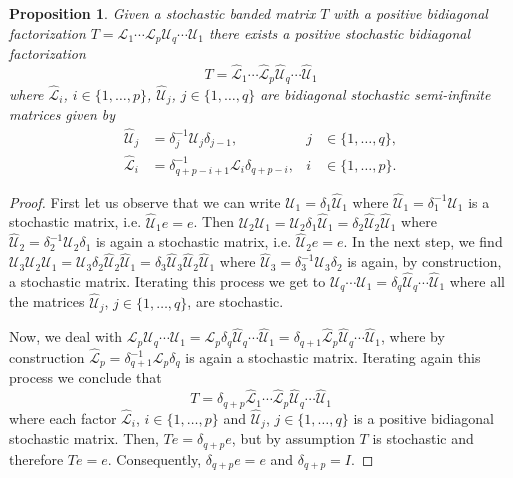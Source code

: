 \documentclass[11pt]{amsart}
\theoremstyle{plain}
\newtheorem{pro}[teo]{Proposition}
\newcommand{\1}{\text{\fontseries{bx}\selectfont \textup 1}}
\begin{document}
\begin{pro}
	Given a stochastic banded matrix $T$ with a positive bidiagonal factorization $T=\mathscr L_1\cdots \mathscr L_p\mathscr U_q\cdots \mathscr U_1$ there exists a positive stochastic bidiagonal factorization
	\[
	T=	\hat{\mathscr L}_1\cdots\hat{\mathscr L}_p\hat{\mathscr U}_q\cdots \hat{\mathscr U}_1
	\]
	where $\hat{\mathscr L}_i$, $i\in\{1,\dots,p\}$, $\hat{\mathscr U}_j$, $j\in\{1,\dots,q\}$ are bidiagonal stochastic semi-infinite matrices given by
	\[
	\begin{aligned}
		\hat{\mathscr U}_j &= \delta_j^{-1} \mathscr U_j \delta_{j-1}, & j&\in\{1,\dots,q\},\\
		\hat{\mathscr L}_i&= \delta_{q+p-i+1}^{-1} \mathscr L_i \delta_{q+p-i},& i&\in\{1,\dots,p\}.
	\end{aligned}
	\]
\end{pro}
\begin{proof}
	First let us observe that we can write $\mathscr U_1=\delta_1 \hat {\mathscr U}_1$ where $\hat{ \mathscr U}_1=\delta_1^{-1}\mathscr U_1$ is a stochastic matrix, i.e. $\hat{\mathscr U}_1 e=e$. Then $\mathscr U_2\mathscr U_1 =\mathscr U_2\delta_1\hat{\mathscr U}_1=\delta_2 \hat{\mathscr U}_2\hat{\mathscr U}_1$ where $\hat{\mathscr U}_2=\delta_2^{-1}\mathscr U_2\delta_1$ is again a stochastic matrix, i.e. $\hat{\mathscr U}_2 e=e$. In the next step, we find $\mathscr U_3\mathscr U_2\mathscr U_1= \mathscr U_3 \delta _2 \hat{\mathscr U}_2\hat{\mathscr U}_1=\delta_3\hat{\mathscr U}_3\hat{\mathscr U}_2\hat{\mathscr U}_1$ where $\hat{\mathscr U}_3=\delta_3^{-1}\mathscr U_3 \delta_2$ is again, by construction, a stochastic matrix. Iterating this process we get to $\mathscr U_q\cdots \mathscr U_1 =\delta_q\hat{\mathscr U}_q\cdots \hat{\mathscr U}_1$ where all the matrices $\hat{\mathscr U}_j$, $j\in\{1,\dots,q\}$, are stochastic.
	
	Now, we deal with $\mathscr L_p\mathscr U_q\cdots \mathscr U_1=\mathscr L_p\delta_q\hat{\mathscr U}_q\cdots \hat{\mathscr U}_1= \delta_{q+1}\hat{\mathscr L}_p\hat{\mathscr U}_q\cdots \hat{\mathscr U}_1$, where by construction $\hat{\mathscr L}_p=\delta_{q+1}^{-1}\mathscr L_p\delta_q$ is again a stochastic matrix. Iterating again this process we conclude that
	\[
	T=\delta_{q+p}\hat{\mathscr L}_1\cdots\hat{\mathscr L}_p\hat{\mathscr U}_q\cdots \hat{\mathscr U}_1
	\]
	where each factor $\hat{\mathscr L}_i$, $i\in\{1,\dots, p\}$ and $\hat{\mathscr U}_j$, $j\in\{1,\dots,q\}$ is a positive bidiagonal stochastic matrix. Then, $Te=\delta_{q+p}e$, but by assumption $T$ is stochastic and therefore $Te=e$. Consequently, $\delta_{q+p}e=e$ and $\delta_{q+p}=I$.
\end{proof}
\end{document}
